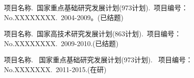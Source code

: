 \begin{project}
\item 项目名称.~国家重点基础研究发展计划(973计划).~项目编号：No.XXXXXXXX.~2004-2009。(已结题)
\item
    项目名称.~国家高技术研究发展计划(863计划).~项目编号：No.XXXXXXXX.~2009-2010.(已结题)
\item
    项目名称. ~国家重点基础研究发展计划(973计划). ~项目编号：No.XXXXXXX.~2011-2015.(在研)
\end{project} 
